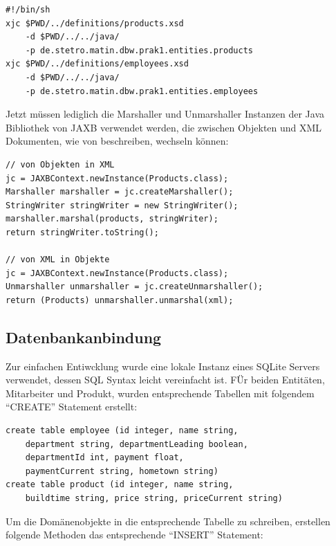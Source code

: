 \documentclass[DIV=calc,paper=a4,fontsize=9pt,twocolumn]{scrartcl}
\begin{document}
\lstset{language=XML}
\begin{lstlisting}





#!/bin/sh
xjc $PWD/../definitions/products.xsd 
    -d $PWD/../../java/ 
    -p de.stetro.matin.dbw.prak1.entities.products
xjc $PWD/../definitions/employees.xsd 
    -d $PWD/../../java/ 
    -p de.stetro.matin.dbw.prak1.entities.employees
\end{lstlisting}

Jetzt müssen lediglich die Marshaller und Unmarshaller Instanzen der Java Bibliothek von JAXB verwendet werden, die zwischen Objekten und XML Dokumenten, wie von \citet{vogella} beschreiben, wechseln können:

\lstset{language=Java}
\begin{lstlisting}
// von Objekten in XML
jc = JAXBContext.newInstance(Products.class);
Marshaller marshaller = jc.createMarshaller();
StringWriter stringWriter = new StringWriter();
marshaller.marshal(products, stringWriter);
return stringWriter.toString();

// von XML in Objekte
jc = JAXBContext.newInstance(Products.class);
Unmarshaller unmarshaller = jc.createUnmarshaller();
return (Products) unmarshaller.unmarshal(xml);
\end{lstlisting}

\subsection{Datenbankanbindung}

Zur einfachen Entiwcklung wurde eine lokale Instanz eines SQLite Servers verwendet, dessen SQL Syntax leicht vereinfacht ist. FÜr beiden Entitäten, Mitarbeiter und Produkt, wurden entsprechende Tabellen mit folgendem \enquote{CREATE} Statement erstellt:

\lstset{language=SQL}
\begin{lstlisting}
create table employee (id integer, name string, 
    department string, departmentLeading boolean, 
    departmentId int, payment float, 
    paymentCurrent string, hometown string)
create table product (id integer, name string,
    buildtime string, price string, priceCurrent string)
\end{lstlisting}

Um die Domänenobjekte in die entsprechende Tabelle zu schreiben, erstellen folgende Methoden das entsprechende \enquote{INSERT} Statement:
\end{document}

